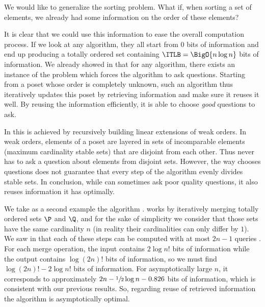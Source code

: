 
We would like to generalize the sorting problem. What if, when sorting a set of
elements, we already had some information on the order of these elements?


It is clear that we could use this information to ease the overall computation
process. If we look at any \BigO{\ITLB} algorithm, they all start from
$0$ bits of information and end up producing a totally ordered set containing
$\ITLB = \BigO{n \log n}$ bits of information. We already showed in
 that for any algorithm, there exists an instance of the
problem which forces the algorithm to ask  questions.
Starting from a poset whose order is completely unknown, such an algorithm
thus iteratively updates this poset by retrieving information and make sure it
reuses it well. By reusing the information efficiently, it is able to
choose \emph{good} questions to ask.


In \quicksort this is achieved by recursively building linear extensions of weak
orders. In weak orders, elements of a poset are layered in sets of incomparable
elements (maximum cardinality stable sets) that are disjoint from each other.
Thus \quicksort never has to ask a question about elements from disjoint
sets. However, the way \quicksort chooses questions does not guarantee that every
step of the algorithm evenly divides stable sets. In conclusion, while
\quicksort can sometimes ask poor quality questions, it also reuses information
it has optimally.


We take as a second example the algorithm \mergesort. \mergesort works by
iteratively merging totally ordered sets $\P$ and $\Q$, and for the sake of
simplicity we consider that those sets have the same cardinality $n$  (in
reality their cardinalities can only differ by $1$). We saw in
 that each of these steps can be computed with at most
\(2n-1\) queries . For each merge operation, the input
contains $2 \log n!$ bits of information while the output contains $\log (2n)!$
bits of information, so we must find \(\log (2n)! - 2 \log n!\) bits of
information. For asymptotically large \(n\), it corresponds to approximately
\(2 n - \sfrac{1}{2} \log n - 0.826\) bits of information, which is
consistent with our previous results. So, regarding reuse of retrieved
information the \mergesort algorithm is asymptotically optimal.

